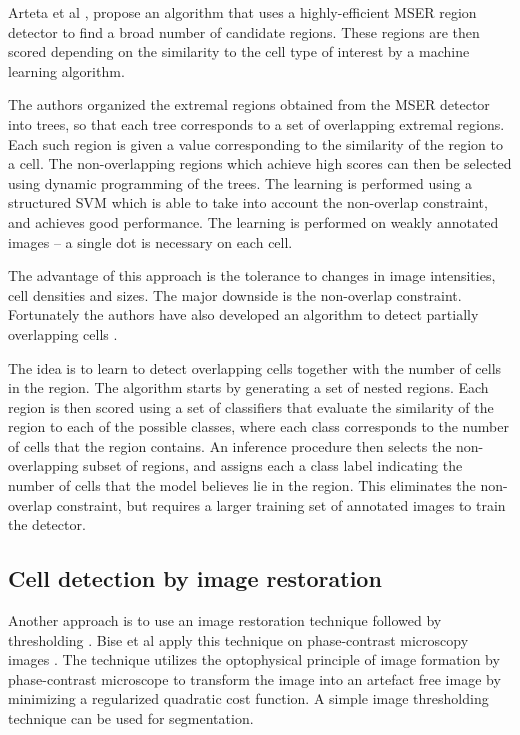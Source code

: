 Arteta et al \cite{arteta12}\cite{arteta13}, propose an algorithm that uses a highly-efficient MSER region detector \cite{matas02} to find a broad number of candidate regions. These regions are then scored depending on the similarity to the cell type of interest by a machine learning algorithm. 

The authors organized the extremal regions obtained from the MSER detector into trees, so that each tree corresponds to a set of overlapping extremal regions. Each such region is given a value corresponding to the similarity of the region to a cell. The non-overlapping regions which achieve high scores can then be selected using dynamic programming of the trees. The learning is performed using a structured SVM \cite{joachims09} which is able to take into account the non-overlap constraint, and achieves good performance. The learning is performed on weakly annotated images -- a single dot is necessary on each cell.

The advantage of this approach is the tolerance to changes in image intensities, cell densities and sizes. The major downside is the non-overlap constraint. Fortunately the authors have also developed an algorithm to detect partially overlapping cells \cite{arteta13}. 

The idea is to learn to detect overlapping cells together with the number of cells in the region. The algorithm starts by generating a set of nested regions. Each region is then scored using a set of classifiers that evaluate the similarity of the region to each of the possible classes, where each class corresponds to the number of cells that the region contains. An inference procedure then selects the non-overlapping subset of regions, and assigns each a class label indicating the number of cells that the model believes lie in the region. This eliminates the non-overlap constraint, but requires a larger training set of annotated images to train the detector.

\subsection{Cell detection by image restoration \statusfirstdraft}

Another approach is to use an image restoration technique followed by thresholding \cite{bise11} \cite{huh13}. Bise et al \cite{bise11} apply this technique on phase-contrast microscopy images . The technique utilizes the optophysical principle of image formation by phase-contrast microscope to transform the image into an artefact free image by minimizing a regularized quadratic cost function. A simple image thresholding technique can be used for segmentation.

